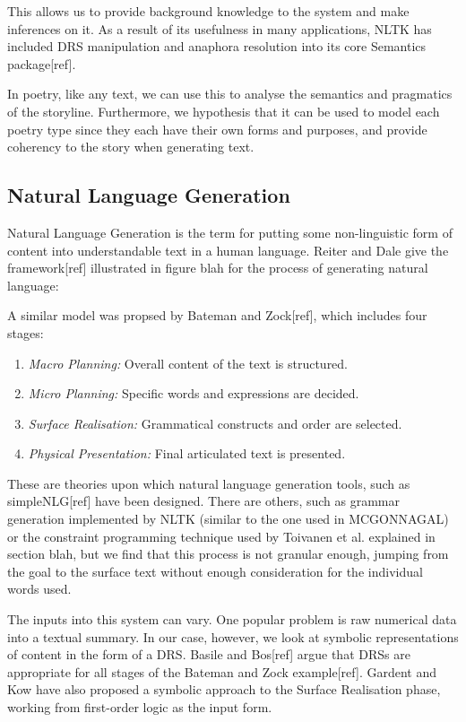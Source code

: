 This allows us to provide background knowledge to the system and make inferences on it. As a result of its usefulness in many applications, NLTK has included DRS manipulation and anaphora resolution into its core Semantics package[ref]. 

In poetry, like any text, we can use this to analyse the semantics and pragmatics of the storyline. Furthermore, we hypothesis that it can be used to model each poetry type since they each have their own forms and purposes, and provide coherency to the story when generating text.

\subsection{Natural Language Generation}
Natural Language Generation is the term for putting some non-linguistic form of content into understandable text in a human language. Reiter and Dale give the framework[ref] illustrated in figure blah for the process of generating natural language:


A similar model was propsed by Bateman and Zock[ref], which includes four stages:
\begin{enumerate}
\item{\textit{Macro Planning:} Overall content of the text is structured.}
\item{\textit{Micro Planning:} Specific words and expressions are decided.}
\item{\textit{Surface Realisation:} Grammatical constructs and order are selected.}
\item{\textit{Physical Presentation:} Final articulated text is presented.}
\end{enumerate}

These are theories upon which natural language generation tools, such as simpleNLG[ref] have been designed. There are others, such as grammar generation implemented by NLTK (similar to the one used in MCGONNAGAL) or the constraint programming technique used by Toivanen et al. explained in section blah, but we find that this process is not granular enough, jumping from the goal to the surface text without enough consideration for the individual words used.

The inputs into this system can vary. One popular problem is raw numerical data into a textual summary. In our case, however, we look at symbolic representations of content in the form of a DRS. Basile and Bos[ref] argue that DRSs are appropriate for all stages of the Bateman and Zock example[ref]. Gardent and Kow have also proposed a symbolic approach to the Surface Realisation phase, working from first-order logic as the input form.

